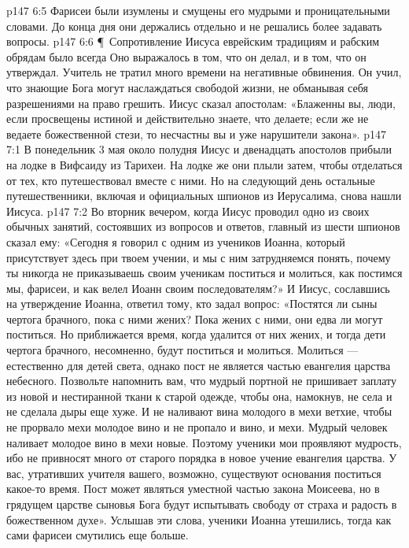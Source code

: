 \vs p147 6:5 Фарисеи были изумлены и смущены его мудрыми и проницательными словами. До конца дня они держались отдельно и не решались более задавать вопросы.
\vs p147 6:6 \P\ Сопротивление Иисуса еврейским традициям и рабским обрядам было всегда  Оно выражалось в том, что он делал, и в том, что он утверждал. Учитель не тратил много времени на негативные обвинения. Он учил, что знающие Бога могут наслаждаться свободой жизни, не обманывая себя разрешениями на право грешить. Иисус сказал апостолам: «Блаженны вы, люди, если просвещены истиной и действительно знаете, что делаете; если же не ведаете божественной стези, то несчастны вы и уже нарушители закона».
\vs p147 7:1 В понедельник 3 мая около полудня Иисус и двенадцать апостолов прибыли на лодке в Вифсаиду из Тарихеи. На лодке же они плыли затем, чтобы отделаться от тех, кто путешествовал вместе с ними. Но на следующий день остальные путешественники, включая и официальных шпионов из Иерусалима, снова нашли Иисуса.
\vs p147 7:2 Во вторник вечером, когда Иисус проводил одно из своих обычных занятий, состоявших из вопросов и ответов, главный из шести шпионов сказал ему: «Сегодня я говорил с одним из учеников Иоанна, который присутствует здесь при твоем учении, и мы с ним затрудняемся понять, почему ты никогда не приказываешь своим ученикам поститься и молиться, как постимся мы, фарисеи, и как велел Иоанн своим последователям?» И Иисус, сославшись на утверждение Иоанна, ответил тому, кто задал вопрос: «Постятся ли сыны чертога брачного, пока с ними жених? Пока жених с ними, они едва ли могут поститься. Но приближается время, когда удалится от них жених, и тогда дети чертога брачного, несомненно, будут поститься и молиться. Молиться --- естественно для детей света, однако пост не является частью евангелия царства небесного. Позвольте напомнить вам, что мудрый портной не пришивает заплату из новой и нестиранной ткани к старой одежде, чтобы она, намокнув, не села и не сделала дыры еще хуже. И не наливают вина молодого в мехи ветхие, чтобы не прорвало мехи молодое вино и не пропало и вино, и мехи. Мудрый человек наливает молодое вино в мехи новые. Поэтому ученики мои проявляют мудрость, ибо не привносят много от старого порядка в новое учение евангелия царства. У вас, утративших учителя вашего, возможно, существуют основания поститься какое\hyp{}то время. Пост может являться уместной частью закона Моисеева, но в грядущем царстве сыновья Бога будут испытывать свободу от страха и радость в божественном духе». Услышав эти слова, ученики Иоанна утешились, тогда как сами фарисеи смутились еще больше.
